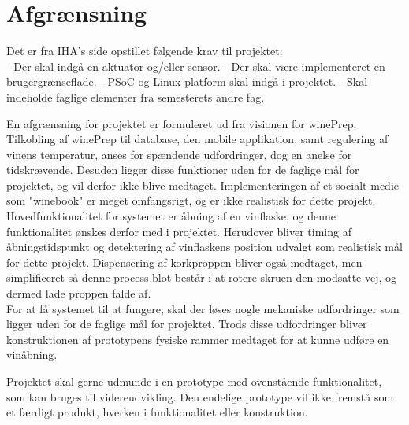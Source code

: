 \chapter{Afgrænsning}
Det er fra IHA's side opstillet følgende krav til projektet:\\
- Der skal indgå en aktuator og/eller sensor.
- Der skal være implementeret en brugergrænseflade.
- PSoC og Linux platform skal indgå i projektet.
- Skal indeholde faglige elementer fra semesterets andre fag.

En afgrænsning for projektet er formuleret ud fra visionen for winePrep. Tilkobling af winePrep til database, den mobile applikation, samt regulering af vinens 
temperatur, anses for spændende udfordringer, dog en anelse for tidskrævende. Desuden ligger disse funktioner uden for de faglige mål for projektet, og vil 
derfor ikke blive medtaget. Implementeringen af et socialt medie som "winebook" er meget omfangsrigt, og er ikke realistisk for dette projekt.\\

Hovedfunktionalitet for systemet er åbning af en vinflaske, og denne funktionalitet ønskes derfor med i projektet. Herudover bliver timing af åbningstidspunkt 
og detektering af vinflaskens position udvalgt som realistisk mål for dette projekt. Dispensering af korkproppen bliver også medtaget, men simplificeret så denne
process blot består i at rotere skruen den modsatte vej, og dermed lade proppen falde af.\\

For at få systemet til at fungere, skal der løses nogle mekaniske udfordringer som ligger uden for de faglige mål for projektet. Trods disse udfordringer
bliver konstruktionen af prototypens fysiske rammer medtaget for at kunne udføre en vinåbning.

Projektet skal gerne udmunde i en prototype med ovenstående funktionalitet, som kan bruges til videreudvikling. Den endelige prototype vil ikke fremstå som et 
færdigt produkt, hverken i funktionalitet eller konstruktion. 

    